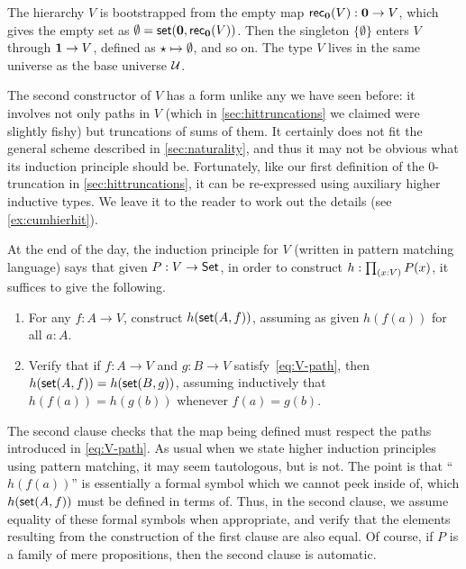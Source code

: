 The hierarchy $V$ is
bootstrapped from the empty map $\mathsf{rec}_{\mathbf{0}}(V) : \mathbf{0} \to V$, which gives the empty set as $\emptyset = \mathsf{set}(\mathbf{0},\mathsf{rec}_{\mathbf{0}}(V))$.
Then the singleton $\{\emptyset\}$ enters $V$ through $\mathbf{1} \to V$, defined as $\star \mapsto \emptyset$, and so
on. The type $V$ lives in the same universe as the base universe $\mathcal{U}$.

The second constructor of $V$ has a form unlike any we have seen before: it involves not only paths in $V$ (which in \autoref{sec:hittruncations} we claimed were slightly fishy) but truncations of sums of them.
It certainly does not fit the general scheme described in \autoref{sec:naturality}, and thus it may not be obvious what its induction principle should be.
Fortunately, like our first definition of the 0-truncation in \autoref{sec:hittruncations}, it can be re-expressed using auxiliary higher inductive types.
We leave it to the reader to work out the details (see \autoref{ex:cumhierhit}).

%
At the end of the day, the induction principle for $V$ (written in pattern matching language) says that given $P:V\to \mathsf{Set}$, in order to construct $h:\prd{x:V} P(x)$, it suffices to give the following.
\begin{enumerate}
\item For any $f:A\to V$, construct $h(\mathsf{set}(A,f))$, assuming as given $h(f(a))$ for all $a:A$.
\item Verify that if $f : A \to V$ and $g : B \to V$ satisfy~\eqref{eq:V-path}, then $h(\mathsf{set}(A,f)) = h(\mathsf{set}(B,g))$, assuming inductively that $h(f(a)) = h(g(b))$ whenever $f(a)=g(b)$.
\end{enumerate}
The second clause checks that the map being defined must respect the paths introduced in \eqref{eq:V-path}.
As usual when we state higher induction principles using pattern matching, it may seem tautologous, but is not.
The point is that ``$h(f(a))$'' is essentially a formal symbol which we cannot peek inside of, which $h(\mathsf{set}(A,f))$ must be defined in terms of. Thus, in the second clause, we assume equality of these formal symbols when appropriate, and verify that the elements resulting from the construction of the first clause are also equal.  
Of course, if $P$ is a family of mere propositions, then the second clause is automatic.

